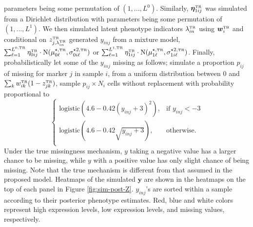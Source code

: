 \documentclass[12pt,]{article}
\newcommand{\p}[1]{\left(#1\right)}
\newcommand{\N}{ \mathcal{N} }
\def\beginmyfig{\begin{figure}[H]\center}
\def\endmyfig{\end{figure}}
\def\bet{\bm{\eta}}
\def\N{\text{N}}
\def\y{\bm{y}}
\newcommand{\true}{{\mbox{\tiny TR}}}
\newcommand{\bw}{\mbox{\boldmath $w$}}
\def\beginmyfig{\begin{figure}[H]\center}
\def\endmyfig{\end{figure}}
\begin{document}
parameters being some permutation of $(1,...,L^0)$. Similarly, 
$\bet_{1ij}^\true$ was simulated from a Dirichlet distribution with
parameters being some permutation of $(1,...,L^1)$.
%
We then simulated latent phenotype indicators $\lambda_{in}^\true$ using
$\bw_i^\true$ and conditional on $z^\true_{j,\lambda_{in}^\true}$ generated
$y_{inj}$ from a mixture model, $\sum_{\ell=1}^{L^{0,\true}}
\eta^\true_{0ij}\cdot\N(\mu^{\star, \true}_{0\ell}, \sigma^{\star 2,
\true}_{0i\ell})$ or $\sum_{\ell=1}^{L^{1,\true}}
\eta^\true_{1ij}\cdot\N(\mu^{\star, \true}_{1\ell}, \sigma^{\star 2,
\true}_{1i\ell})$.   Finally, probabilistically let some of the $y_{inj}$
missing as follows; simulate a proportion $p_{ij}$ of missing for marker
$j$ in sample $i$, from a uniform distribution between 0 and  $\sum_k
w^\true_{ik}(1-z^\true_{jk})$, sample $p_{ij}\times N_i$ cells without
replacement with probability proportional to
$$
\begin{cases}
  \text{logistic}\p{4.6 - 0.42(y_{inj}+3)^2}, & \text{if } y_{inj} < -3 \\
  \text{logistic}\p{4.6 - 0.42\sqrt{y_{inj}+3}}, & \text{otherwise.} \\
\end{cases}
$$
%
Under the true missingness mechanism, $y$ taking a negative value has a larger
chance to be missing, while $y$ with a positive value has only slight chance of
being missing.  Note that the true mechanism is different from that assumed in
the proposed model.   Heatmaps of the simulated $\y$ are shown in the heatmaps
on the top of each panel in Figure \ref{fig:sim-post-Z}. $y_{inj}$'s are sorted
within a sample according to their posterior phenotype estimates.  Red, blue
and white colors represent high expression levels, low expression levels, and
missing values, respectively.

\end{document}
